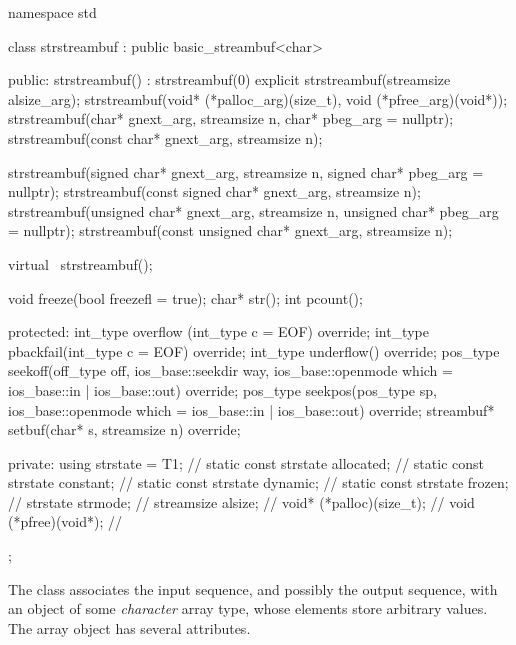 %
\begin{codeblock}
namespace std {
  class strstreambuf : public basic_streambuf<char> {
  public:
    strstreambuf() : strstreambuf(0) {}
    explicit strstreambuf(streamsize alsize_arg);
    strstreambuf(void* (*palloc_arg)(size_t), void (*pfree_arg)(void*));
    strstreambuf(char* gnext_arg, streamsize n, char* pbeg_arg = nullptr);
    strstreambuf(const char* gnext_arg, streamsize n);

    strstreambuf(signed char* gnext_arg, streamsize n,
                 signed char* pbeg_arg = nullptr);
    strstreambuf(const signed char* gnext_arg, streamsize n);
    strstreambuf(unsigned char* gnext_arg, streamsize n,
                 unsigned char* pbeg_arg = nullptr);
    strstreambuf(const unsigned char* gnext_arg, streamsize n);

    virtual ~strstreambuf();

    void  freeze(bool freezefl = true);
    char* str();
    int   pcount();

  protected:
    int_type overflow (int_type c = EOF) override;
    int_type pbackfail(int_type c = EOF) override;
    int_type underflow() override;
    pos_type seekoff(off_type off, ios_base::seekdir way,
                     ios_base::openmode which = ios_base::in | ios_base::out) override;
    pos_type seekpos(pos_type sp,
                     ios_base::openmode which = ios_base::in | ios_base::out) override;
    streambuf* setbuf(char* s, streamsize n) override;

  private:
    using strstate = T1;                // \expos
    static const strstate allocated;    // \expos
    static const strstate constant;     // \expos
    static const strstate dynamic;      // \expos
    static const strstate frozen;       // \expos
    strstate strmode;                   // \expos
    streamsize alsize;                  // \expos
    void* (*palloc)(size_t);            // \expos
    void (*pfree)(void*);               // \expos
  };
}
\end{codeblock}

\pnum
The class
associates the input sequence, and possibly the output sequence, with an object of some
\textit{character}
array type, whose elements store arbitrary values.
The array object has several attributes.

